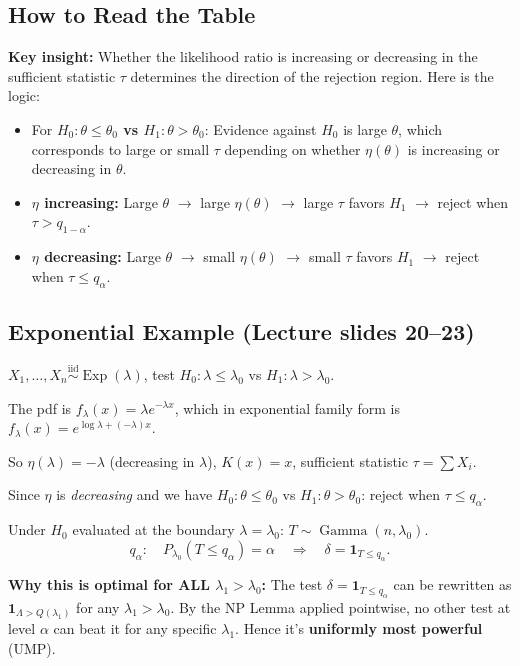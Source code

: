 \documentclass[11pt,a4paper]{article}
\newcommand{\iid}{\overset{\text{iid}}{\sim}}
\begin{document}
\subsection{How to Read the Table}

\textbf{Key insight:} Whether the likelihood ratio is increasing or decreasing in the sufficient statistic $\tau$ determines the direction of the rejection region. Here is the logic:

\begin{itemize}
  \item For \textbf{$H_0:\theta\leq\theta_0$ vs $H_1:\theta>\theta_0$}: Evidence against $H_0$ is large $\theta$, which corresponds to large or small $\tau$ depending on whether $\eta(\theta)$ is increasing or decreasing in $\theta$.
  \item \textbf{$\eta$ increasing:} Large $\theta$ $\to$ large $\eta(\theta)$ $\to$ large $\tau$ favors $H_1$ $\to$ reject when $\tau > q_{1-\alpha}$.
  \item \textbf{$\eta$ decreasing:} Large $\theta$ $\to$ small $\eta(\theta)$ $\to$ small $\tau$ favors $H_1$ $\to$ reject when $\tau \leq q_\alpha$.
\end{itemize}

\subsection{Exponential Example (Lecture slides 20--23)}

$X_1,\ldots,X_n \iid \operatorname{Exp}(\lambda)$, test $H_0:\lambda\leq\lambda_0$ vs $H_1:\lambda>\lambda_0$.

The pdf is $f_\lambda(x)=\lambda e^{-\lambda x}$, which in exponential family form is $f_\lambda(x)=e^{\log\lambda+(-\lambda)x}$.

So $\eta(\lambda)=-\lambda$ (decreasing in $\lambda$), $K(x)=x$, sufficient statistic $\tau=\sum X_i$.

Since $\eta$ is \emph{decreasing} and we have $H_0:\theta\leq\theta_0$ vs $H_1:\theta>\theta_0$: reject when $\tau\leq q_\alpha$.

Under $H_0$ evaluated at the boundary $\lambda=\lambda_0$: $T\sim\operatorname{Gamma}(n,\lambda_0)$.
\[
  q_\alpha: \quad P_{\lambda_0}(T\leq q_\alpha) = \alpha \quad\Rightarrow\quad \delta = \mathbf{1}_{T\leq q_\alpha}.
\]

\textbf{Why this is optimal for ALL $\lambda_1>\lambda_0$:} The test $\delta=\mathbf{1}_{T\leq q_\alpha}$ can be rewritten as $\mathbf{1}_{\Lambda>Q(\lambda_1)}$ for any $\lambda_1>\lambda_0$. By the NP Lemma applied pointwise, no other test at level $\alpha$ can beat it for any specific $\lambda_1$. Hence it's \textbf{uniformly most powerful} (UMP).
\end{document}
